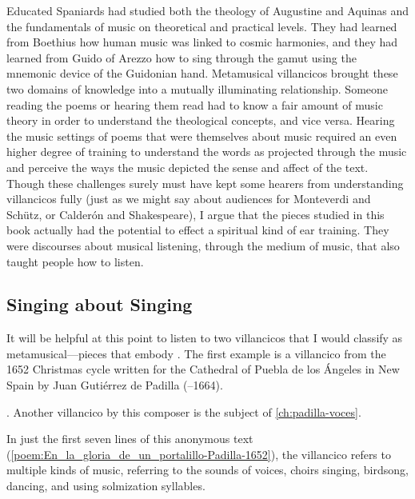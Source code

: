 Educated Spaniards had studied both the theology of Augustine and Aquinas and  
the fundamentals of music on theoretical and practical levels. 
They had learned from Boethius how human music was linked to cosmic harmonies,
and they had learned from Guido of Arezzo how to sing through the gamut using
the mnemonic device of the Guidonian hand.
Metamusical villancicos brought these two domains of knowledge into a mutually
illuminating relationship.
Someone reading the poems or hearing them read had to know a fair amount of
music theory in order to understand the theological concepts, and vice versa.
Hearing the music settings of poems that were themselves about music required
an even higher degree of training to understand the words as projected through
the music and perceive the ways the music depicted the sense and affect of the
text.
Though these challenges surely must have kept some hearers from understanding
villancicos fully (just as we might say about audiences for Monteverdi and
Schütz, or Calderón and Shakespeare), I argue that the pieces studied in this
book actually had the potential to effect a spiritual kind of ear training. 
They were discourses about musical listening, through the medium of music, that
also taught people how to listen.

\subsection{Singing about Singing}

It will be helpful at this point to listen to two villancicos that I would
classify as metamusical---pieces that embody .%
    \autocites{Murata:Singing}
    [\XXX]{Illari:Polychoral}
The first example is a villancico from the 1652 Christmas cycle written for the
Cathedral of Puebla de los Ángeles in New Spain by Juan Gutiérrez de Padilla
(--1664).%
\begin{Footnote}
    . 
    Another villancico by this composer is the subject of
    \cref{ch:padilla-voces}.
\end{Footnote}
In just the first seven lines of this anonymous text
(\cref{poem:En_la_gloria_de_un_portalillo-Padilla-1652}), the villancico refers
to multiple kinds of music, referring to the sounds of voices, choirs singing,
birdsong, dancing, and using solmization syllables.

